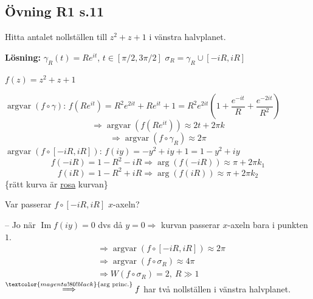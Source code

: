 \subsection{Övning R1 s.11}
Hitta antalet nollställen till $z^2 + z + 1$ i vänstra halvplanet.

\textbf{Lösning:}
$\gamma_R(t) = Re^{it}$, $t \in [\pi/2, 3\pi/2]$ \qquad $\sigma_R = \gamma_R \cup [-iR, iR]$

$f(z) = z^2 + z + 1$

\emph{$\operatorname{argvar}(f \circ \gamma)$}: \quad $f(Re^{it}) = R^2 e^{2it} + Re^{it} + 1 = R^2 e^{2it}\left( 1 + \dfrac{e^{-it}}{R} + \dfrac{e^{-2it}}{R^2} \right)$
\[ \Rightarrow \operatorname{argvar}(f(Re^{it})) \approx 2t + 2\pi k \]
\[ \Rightarrow \operatorname{argvar}(f \circ \gamma_R) \approx 2\pi \]
\emph{$\operatorname{argvar}(f \circ [-iR, iR])$}: \quad $f(iy) = -y^2 + iy + 1 = 1 - y^2 + iy$
\[ f(-iR) = 1 - R^2 - iR \Rightarrow \arg(f(-iR)) \approx \pi + 2\pi k_1 \]
\[ f(iR) = 1 - R^2 + iR \Rightarrow \arg(f(iR)) \approx \pi + 2\pi k_2 \]
\textcolor{magenta!80!black}{} \quad \{rätt kurva är \textcolor{magenta!80!black}{\underline{rosa}} kurvan\}

Var passerar $f \circ [-iR, iR]$ $x$-axeln?

-- Jo när $\operatorname{Im} f(iy) = 0$ dvs då $y = 0 \Rightarrow$ kurvan passerar $x$-axeln bara i punkten $1$.
\begin{align*}
  &\Rightarrow \operatorname{argvar}(f \circ [-iR, iR]) \approx 2\pi \\
  &\Rightarrow \operatorname{argvar}(f \circ \sigma_R) \approx 4\pi \\
  &\Rightarrow W(f \circ \sigma_R) = 2,\ R \gg 1
\end{align*}
$\overset{\textcolor{magenta!80!black}{\text{arg princ.}}}{\Longrightarrow} f$ har två nollställen i vänstra halvplanet.
